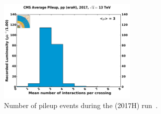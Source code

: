 \begin{figure}[htb]
\centering
  \includegraphics[width=0.6\textwidth]{plots/Data/pileup_pp_lowPU_2017.pdf}
  \caption{Number of pileup events during the \serah (2017H) run~\cite{LumiCalibTwiki}.}
  \label{fig:data:lumiPU13}
\end{figure}